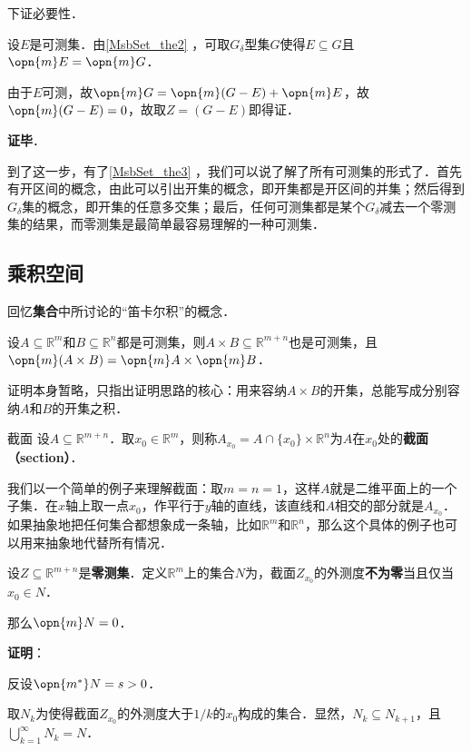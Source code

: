 下证必要性．

设$E$是可测集．由\autoref{MsbSet_the2} ，可取$G_\delta$型集$G$使得$E\subseteq G$且$\opn{m}E=\opn{m}G$．

由于$E$可测，故$\opn{m}G=\opn{m}(G-E)+\opn{m}E$，故$\opn{m}(G-E)=0$，故取$Z=(G-E)$即得证．

\textbf{证毕}．

到了这一步，有了\autoref{MsbSet_the3} ，我们可以说了解了所有可测集的形式了．首先有开区间的概念，由此可以引出开集的概念，即开集都是开区间的并集；然后得到$G_\delta$集的概念，即开集的任意多交集；最后，任何可测集都是某个$G_\delta$减去一个零测集的结果，而零测集是最简单最容易理解的一种可测集．


\subsection{乘积空间}

回忆\textbf{集合}中所讨论的“笛卡尔积”的概念．

\begin{theorem}{}
设$A\subseteq\mathbb{R}^m$和$B\subseteq\mathbb{R}^n$都是可测集，则$A\times B \subseteq \mathbb{R}^{m+n}$也是可测集，且$\opn{m}(A\times B)=\opn{m}A\times \opn{m}B$．
\end{theorem}

证明本身暂略，只指出证明思路的核心：用来容纳$A\times B$的开集，总能写成分别容纳$A$和$B$的开集之积．

\begin{definition}{截面}
设$A\subseteq\mathbb{R}^{m+n}$．取$x_0\in \mathbb{R}^m$，则称$A_{x_0}=A\cap \{x_0\}\times \mathbb{R}^n$为$A$在$x_0$处的\textbf{截面（section）}．
\end{definition}

我们以一个简单的例子来理解截面：取$m=n=1$，这样$A$就是二维平面上的一个子集．在$x$轴上取一点$x_0$，作平行于$y$轴的直线，该直线和$A$相交的部分就是$A_{x_0}$．如果抽象地把任何集合都想象成一条轴，比如$\mathbb{R}^m$和$\mathbb{R}^n$，那么这个具体的例子也可以用来抽象地代替所有情况．

\begin{theorem}{}
设$Z\subseteq \mathbb{R}^{m+n}$是\textbf{零测集}．定义$\mathbb{R}^m$上的集合$N$为，截面$Z_{x_0}$的外测度\textbf{不为零}当且仅当$x_0\in N$．

那么$\opn{m}N=0$．
\end{theorem}

\textbf{证明}：

反设$\opn{m^*}N=s>0$．

取$N_k$为使得截面$Z_{x_0}$的外测度大于$1/k$的$x_0$构成的集合．显然，$N_k\subseteq N_{k+1}$，且$\bigcup_{k=1}^\infty N_k=N$．

